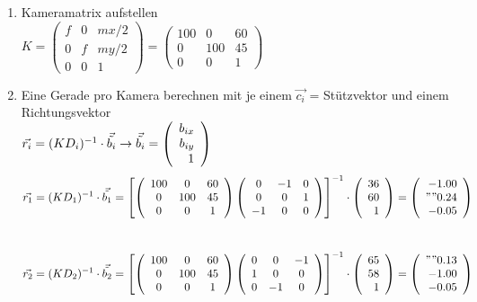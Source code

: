 \begin{enumerate}
	\item Kameramatrix aufstellen\\
		$K=\left(\begin{array}{ccc}
			f & 0 & mx/2\\
			0 & f & my/2\\
			0 & 0 & 1
		\end{array}\right) = \left(\begin{array}{ccc}
		100 & 0 & 60\\
		0 & 100 & 45\\
		0 & 0 & 1
		\end{array}\right)$
	\item Eine Gerade pro Kamera berechnen mit je einem $\vec{c_i}$ = Stützvektor und einem Richtungsvektor\\ $\vec{r_i}=(KD_i)^{-1}\cdot \vec{\tilde{b_i}} \rightarrow \vec{\tilde{b_i}} = \left(\begin{array}{r} b_{ix} \\ b_{iy} \\ 1 \\ \end{array}\right)$\\
	\begin{equation*}
	\vec{r_1}=(KD_1)^{-1}\cdot \vec{\tilde{b_1}} =
	\left[\left(\begin{array}{ccc}
	100 & 0 & 60\\
	0 & 100 & 45\\
	0 & 0 & 1
	\end{array}\right)
	\left(\begin{array}{ccc}
	0 & -1 & 0\\
	0 & 0 & 1\\
	-1 & 0 & 0 
	\end{array}\right)\right]^{-1}\cdot
	\left(\begin{array}{r} 36 \\ 60 \\ 1 \\ \end{array}\right)=\left(\begin{array}{r} -1.00 \\ " "0.24 \\ -0.05 \\ \end{array}\right)
	\end{equation*}\\
	\begin{equation*}
	\vec{r_2}=(KD_2)^{-1}\cdot \vec{\tilde{b_2}} =
	\left[\left(\begin{array}{ccc}
	100 & 0 & 60\\
	0 & 100 & 45\\
	0 & 0 & 1
	\end{array}\right)
	\left(\begin{array}{ccc}
	0 & 0 & -1\\
	1 & 0 & 0\\
	0 & -1 & 0 
	\end{array}\right)\right]^{-1}\cdot
	\left(\begin{array}{r} 65 \\ 58 \\ 1 \\ \end{array}\right)=\left(\begin{array}{r} " "0.13 \\ -1.00 \\ -0.05 \\ \end{array}\right)
	\end{equation*}
	\begin{minipage}{0.5\textwidth}

\end{minipage}
\end{enumerate}
